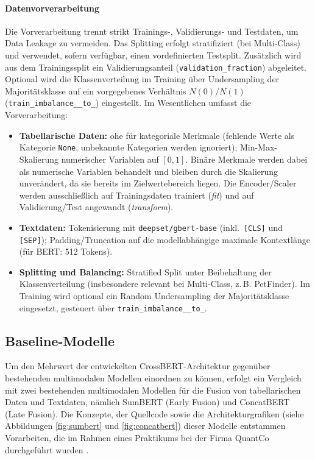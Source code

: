 \paragraph{Datenvorverarbeitung}
Die Vorverarbeitung trennt strikt Trainings-, Validierungs- und Testdaten, um Data Leakage zu vermeiden. Das Splitting erfolgt stratifiziert (bei Multi-Class) und verwendet, sofern verfügbar, einen vordefinierten Testsplit. Zusätzlich wird aus dem Trainingssplit ein Validierungsanteil (\texttt{validation\_\allowbreak fraction}) abgeleitet. Optional wird die Klassenverteilung im Training über Undersampling der Majoritätsklasse auf ein vorgegebenes Verhältnis $N(0)/N(1)$ (\texttt{train\_\allowbreak imbalance\_\_\allowbreak to\_}) eingestellt. Im Wesentlichen umfasst die Vorverarbeitung:
\begin{itemize}
    \item \textbf{Tabellarische Daten:} \Gls{ohe} für kategoriale Merkmale (fehlende Werte als Kategorie \texttt{None}, unbekannte Kategorien werden ignoriert); Min-Max-Skalierung numerischer Variablen auf $[0,1]$. Binäre Merkmale werden dabei als numerische Variablen behandelt und bleiben durch die Skalierung unverändert, da sie bereits im Zielwertebereich liegen. Die Encoder/Scaler werden ausschließlich auf Trainingsdaten trainiert (\textit{fit}) und auf Validierung/Test angewandt (\textit{transform}).
    \item \textbf{Textdaten:} Tokenisierung mit \texttt{deepset\allowbreak/gbert\allowbreak-base} (inkl.\ \texttt{[CLS]} und \texttt{[SEP]}); Padding/Truncation auf die modellabhängige maximale Kontextlänge (für BERT: 512 Tokens).
    \item \textbf{Splitting und Balancing:} Stratified Split unter Beibehaltung der Klassenverteilung (insbesondere relevant bei Multi-Class, z.\,B. PetFinder). Im Training wird optional ein Random Undersampling der Majoritätsklasse eingesetzt, gesteuert über \texttt{train\_\allowbreak imbalance\_\_\allowbreak to\_}.
\end{itemize}

\newpage
\subsection{Baseline-Modelle}
\label{sec:baselines}

Um den Mehrwert der entwickelten CrossBERT-Architektur gegenüber bestehenden multimodalen Modellen einordnen zu können, erfolgt ein Vergleich mit zwei bestehenden multimodalen Modellen für die Fusion von tabellarischen Daten und Textdaten, nämlich SumBERT (Early Fusion) und ConcatBERT (Late Fusion). Die Konzepte, der Quellcode \cite{CrossBERTSource} sowie die Architekturgrafiken (siehe Abbildungen \ref{fig:sumbert} und \ref{fig:concatbert}) dieser Modelle entstammen Vorarbeiten, die im Rahmen eines Praktikums bei der Firma QuantCo durchgeführt wurden \cite{Fuest2024Internship}.

